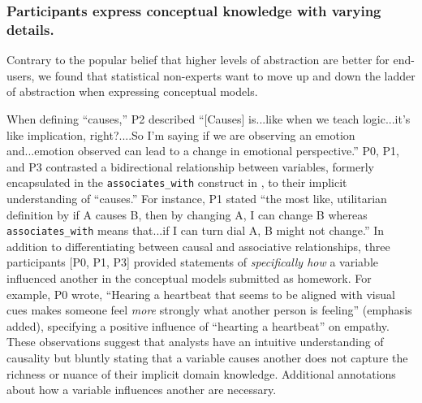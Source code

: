 \subsubsection{Participants express conceptual knowledge with varying details.}
Contrary to the popular belief that higher levels of abstraction are better for
end-users, we found that statistical non-experts want to
move up and down the ladder of abstraction when expressing conceptual models. 

When defining ``causes,'' P2 described ``[Causes] is...like when we teach
logic...it's like implication, right?....So I'm saying if we are observing an
emotion and...emotion observed can lead to a change in emotional perspective.''
P0, P1, and P3 contrasted a bidirectional relationship between variables,
formerly encapsulated in the \texttt{associates\_with} construct in \tisane, to
their implicit understanding of ``causes.'' For instance, P1 stated ``the most
like, utilitarian definition by if A causes B, then by changing A, I can change
B whereas \texttt{associates\_with} means that...if I can turn dial A, B might
not change.'' In addition to differentiating between causal and associative
relationships, three participants [P0, P1, P3] provided statements of
\textit{specifically how} a variable influenced another in the conceptual models
submitted as homework. For example, P0 wrote, ``Hearing a heartbeat that seems
to be aligned with visual cues makes someone feel \textit{more} strongly what
another person is feeling'' (emphasis added), specifying a positive influence of
``hearting a heartbeat'' on empathy. These observations suggest that analysts
have an intuitive understanding of causality but bluntly stating that a variable causes
another does not capture the richness or nuance of their implicit domain knowledge. 
Additional annotations about how a variable influences another are necessary.



